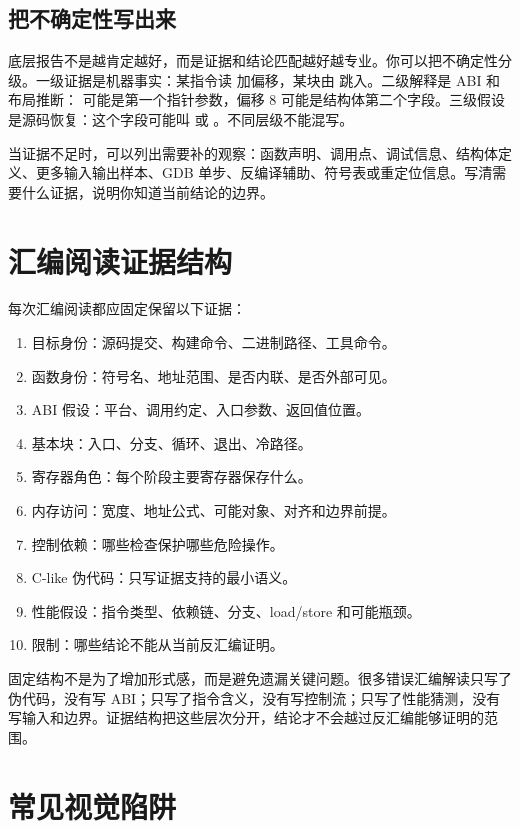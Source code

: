 \subsection{把不确定性写出来}

底层报告不是越肯定越好，而是证据和结论匹配越好越专业。你可以把不确定性分级。一级证据是机器事实：某指令读  加偏移，某块由  跳入。二级解释是 ABI 和布局推断： 可能是第一个指针参数，偏移 8 可能是结构体第二个字段。三级假设是源码恢复：这个字段可能叫  或 。不同层级不能混写。

当证据不足时，可以列出需要补的观察：函数声明、调用点、调试信息、结构体定义、更多输入输出样本、GDB 单步、反编译辅助、符号表或重定位信息。写清需要什么证据，说明你知道当前结论的边界。

\section{汇编阅读证据结构}

每次汇编阅读都应固定保留以下证据：

\begin{enumerate}
  \item 目标身份：源码提交、构建命令、二进制路径、工具命令。
  \item 函数身份：符号名、地址范围、是否内联、是否外部可见。
  \item ABI 假设：平台、调用约定、入口参数、返回值位置。
  \item 基本块：入口、分支、循环、退出、冷路径。
  \item 寄存器角色：每个阶段主要寄存器保存什么。
  \item 内存访问：宽度、地址公式、可能对象、对齐和边界前提。
  \item 控制依赖：哪些检查保护哪些危险操作。
  \item C-like 伪代码：只写证据支持的最小语义。
  \item 性能假设：指令类型、依赖链、分支、load/store 和可能瓶颈。
  \item 限制：哪些结论不能从当前反汇编证明。
\end{enumerate}

固定结构不是为了增加形式感，而是避免遗漏关键问题。很多错误汇编解读只写了伪代码，没有写 ABI；只写了指令含义，没有写控制流；只写了性能猜测，没有写输入和边界。证据结构把这些层次分开，结论才不会越过反汇编能够证明的范围。

\section{常见视觉陷阱}


